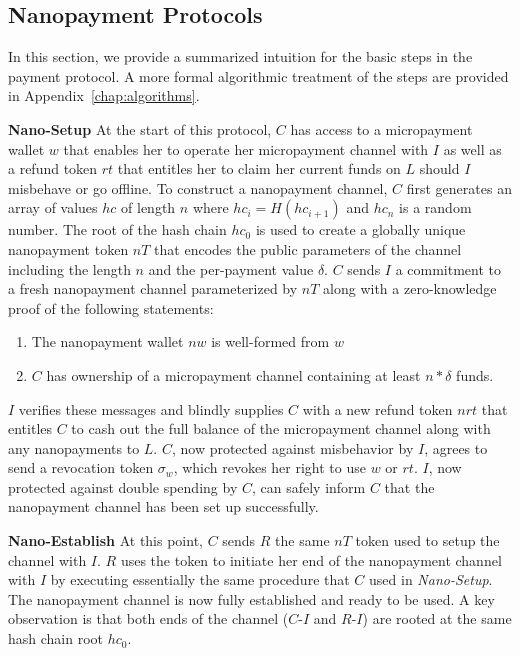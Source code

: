 \subsection{Nanopayment Protocols}
In this section, we provide a summarized intuition for the basic steps in the
payment protocol. A more formal algorithmic treatment of the steps are provided
in Appendix~\ref{chap:algorithms}.

\textbf{Nano-Setup} At the start of this protocol, $C$ has access to a
micropayment wallet $w$ that enables her to operate her micropayment channel
with $I$ as well as a refund token $rt$ that entitles her to claim her current
funds on $L$ should $I$ misbehave or go offline. To construct a nanopayment
channel, $C$ first generates an array of values $hc$ of length $n$ where
$hc_i = H(hc_{i+1})$ and $hc_n$ is a random number. The root of the hash chain
$hc_0$ is used to create a globally unique nanopayment token $nT$ that encodes
the public parameters of the channel including the length $n$ and the
per-payment value $\delta$. $C$ sends $I$ a commitment to a fresh nanopayment
channel parameterized by $nT$ along with a zero-knowledge proof of the following
statements:

\begin{enumerate}
\item The nanopayment wallet $nw$ is well-formed from $w$
\item $C$ has ownership of a micropayment channel containing at least $n *
  \delta$ funds.
\end{enumerate}

$I$ verifies these messages and blindly supplies $C$ with a new refund token
$nrt$ that entitles $C$ to cash out the full balance of the micropayment channel
along with any nanopayments to $L$. $C$, now protected against misbehavior by
$I$, agrees to send a revocation token $\sigma_w$, which revokes her right to
use $w$ or $rt$. $I$, now protected against double spending by $C$, can safely
inform $C$ that the nanopayment channel has been set up successfully.

\textbf{Nano-Establish} At this point, $C$ sends $R$ the same $nT$ token used to
setup the channel with $I$. $R$ uses the token to initiate her end of the
nanopayment channel with $I$ by executing essentially the same procedure that
$C$ used in \emph{Nano-Setup}. The nanopayment channel is now fully established and
ready to be used. A key observation is that both ends of the channel ($C$-$I$
and $R$-$I$) are rooted at the same hash chain root $hc_0$.


